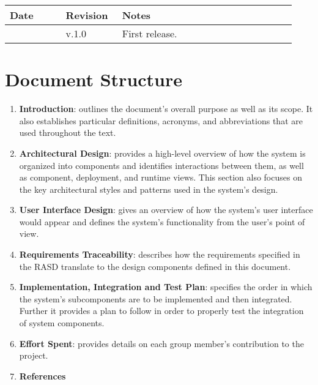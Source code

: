 \begin{center}
	\begin{longtable}{@{}p{0.18\linewidth} p{0.18\linewidth} p{0.57\linewidth}@{}}
		\toprule
		\textbf{Date}   & \textbf{Revision} & \textbf{Notes}\\
		\midrule
        \date{}      & v.1.0             & First release.\\
		\bottomrule
	\end{longtable}
\end{center}

\printbibliography[title={Reference Documents},keyword=intro, heading=subbibnumbered]

\section{Document Structure}

\begin{enumerate}
    \item \textbf{Introduction}: outlines the document's overall purpose as well as its scope. It also establishes particular definitions, acronyms, and abbreviations that are used throughout the text.
    \item \textbf{Architectural Design}: provides a high-level overview of how the system is organized into components and identifies interactions between them, as well as component, deployment, and runtime views. This section also focuses on the key architectural styles and patterns used in the system's design.
    \item \textbf{User Interface Design}: gives an overview of how the system's user interface would appear and defines the system's functionality from the user's point of view.
    \item \textbf{Requirements Traceability}: describes how the requirements specified in the RASD translate to the design components defined in this document.
    \item \textbf{Implementation, Integration and Test Plan}: specifies the order in which the system's subcomponents are to be implemented and then integrated. Further it provides a plan to follow in order to properly test the integration of system components.
    \item \textbf{Effort Spent}: provides details on each group member's contribution to the project.
    \item \textbf{References}
\end{enumerate}
